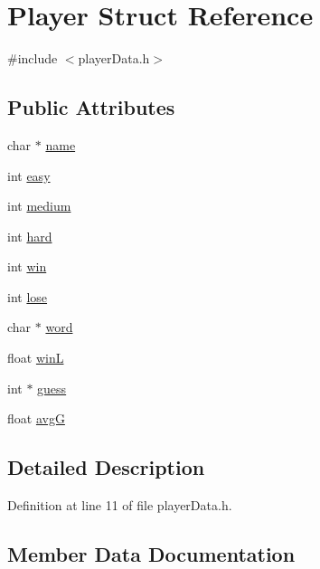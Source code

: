 \hypertarget{struct_player}{}\section{Player Struct Reference}
\label{struct_player}


{\ttfamily \#include $<$player\+Data.\+h$>$}

\subsection*{Public Attributes}
\begin{DoxyCompactItemize}
\item 
char $\ast$ \hyperlink{struct_player_a4af4a10433f33834b59d0c3793358a40}{name}
\item 
int \hyperlink{struct_player_a76526ba3bcfe75f6061e43baf3542536}{easy}
\item 
int \hyperlink{struct_player_a1161025ad0b363ff6c68e3a93d83036a}{medium}
\item 
int \hyperlink{struct_player_aad026e913430091e49f5c9d4b3aef415}{hard}
\item 
int \hyperlink{struct_player_af9dd2aa35519c646928b3592f616722d}{win}
\item 
int \hyperlink{struct_player_a388103ad515736ae91db28560211feb0}{lose}
\item 
char $\ast$ \hyperlink{struct_player_ac5c642a6705035a26aecee0a01a9a769}{word}
\item 
float \hyperlink{struct_player_a00459b6a79fdea92d4f718d0c51aa59e}{winL}
\item 
int $\ast$ \hyperlink{struct_player_ae7fe2dbcb9cc310b5416c0f80cc2b021}{guess}
\item 
float \hyperlink{struct_player_a74858350e855fe9fc8048a76bc40d40b}{avgG}
\end{DoxyCompactItemize}


\subsection{Detailed Description}


Definition at line 11 of file player\+Data.\+h.



\subsection{Member Data Documentation}
\hypertarget{struct_player_a74858350e855fe9fc8048a76bc40d40b}{}\label{struct_player_a74858350e855fe9fc8048a76bc40d40b} 
